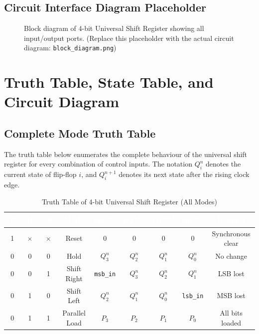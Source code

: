 \documentclass[12pt,a4paper]{report}
\begin{document}
\section{Circuit Interface Diagram Placeholder}

\begin{figure}[H]
    \centering
    \fbox{\rule{0pt}{6cm}\rule{12cm}{0pt}}
    \caption{Block diagram of 4-bit Universal Shift Register showing all input/output ports. (Replace this placeholder with the actual circuit diagram: \texttt{block\_diagram.png})}
    \label{fig:blockdiagram}
\end{figure}

\chapter{Truth Table, State Table, and Circuit Diagram}

\section{Complete Mode Truth Table}

The truth table below enumerates the complete behaviour of the universal shift register for every combination of control inputs. The notation $Q_i^n$ denotes the current state of flip-flop $i$, and $Q_i^{n+1}$ denotes its next state after the rising clock edge.

\begin{table}[H]
\centering
\caption{Truth Table of 4-bit Universal Shift Register (All Modes)}
\renewcommand{\arraystretch}{1.4}
\begin{tabular}{ccccccccc}
    \toprule
    \rowcolor{tableheader}
    \textcolor{white}{\textbf{rst}} &
    \textcolor{white}{\textbf{s[1]}} &
    \textcolor{white}{\textbf{s[0]}} &
    \textcolor{white}{\textbf{Mode}} &
    \textcolor{white}{\textbf{Q3\textsuperscript{n+1}}} &
    \textcolor{white}{\textbf{Q2\textsuperscript{n+1}}} &
    \textcolor{white}{\textbf{Q1\textsuperscript{n+1}}} &
    \textcolor{white}{\textbf{Q0\textsuperscript{n+1}}} &
    \textcolor{white}{\textbf{Remark}} \\
    \midrule
    1 & $\times$ & $\times$ & Reset  & 0 & 0 & 0 & 0 & Synchronous clear \\
    \rowcolor{lightgray}
    0 & 0 & 0 & Hold   & $Q_3^n$ & $Q_2^n$ & $Q_1^n$ & $Q_0^n$ & No change \\
    0 & 0 & 1 & Shift Right & \texttt{msb\_in} & $Q_3^n$ & $Q_2^n$ & $Q_1^n$ & LSB lost \\
    \rowcolor{lightgray}
    0 & 1 & 0 & Shift Left  & $Q_2^n$ & $Q_1^n$ & $Q_0^n$ & \texttt{lsb\_in} & MSB lost \\
    0 & 1 & 1 & Parallel Load & $P_3$ & $P_2$ & $P_1$ & $P_0$ & All bits loaded \\
    \bottomrule
\end{tabular}
\label{tab:truthtable}
\end{table}
\end{document}
